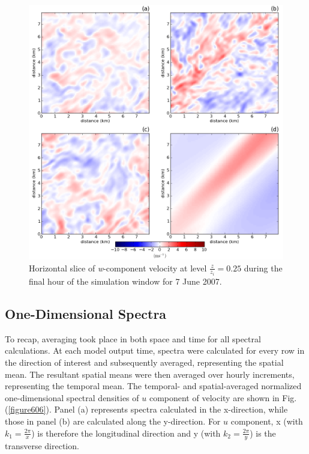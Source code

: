 \begin{figure}[H]
\begin{center}
\includegraphics[width=\textwidth]{figures/chapter6/w_slice_20070607}
\end{center}
\caption{Horizontal slice of \textit{w}-component velocity at level $\frac{z}{z_i} = 0.25$ during the final hour of the simulation window for 7 June 2007.}
\label{figure605}
\end{figure}


\subsection{One-Dimensional Spectra}
\label{spec1d-623}

To recap, averaging took place in both space and time for all spectral calculations. At each model output time, spectra were calculated for every row in the direction of interest and subsequently averaged, representing the spatial mean. The resultant spatial means were then averaged over hourly increments, representing the temporal mean. The temporal- and spatial-averaged normalized one-dimensional spectral densities of $u$ component of velocity are shown in Fig. (\autoref{figure606}). Panel (a) represents spectra calculated in the x-direction, while those in panel (b) are calculated along the y-direction. For $u$ component, x (with $k_1 = \frac{2\pi}{x}$) is therefore the longitudinal direction and y (with $k_2 = \frac{2\pi}{y}$) is the transverse direction. 


